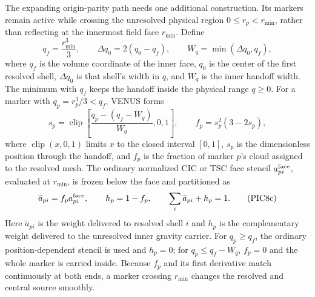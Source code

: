The expanding origin-parity path needs one additional construction.  Its
markers remain active while crossing the unresolved physical region
\(0\leq r_p<r_{\min}\), rather than reflecting at the innermost field face
\(r_{\min}\).  Define
\[
 q_f=\frac{r_{\min}^3}{3},\qquad
 \Delta q_0=2(q_0-q_f),\qquad
 W_q=\min(\Delta q_0,q_f),                               \tag{PIC8a}
\]
where \(q_f\) is the volume coordinate of the inner face, \(q_0\) is the
center of the first resolved shell, \(\Delta q_0\) is that shell's width in
\(q\), and \(W_q\) is the inner handoff width.  The minimum with \(q_f\)
keeps the handoff inside the physical range \(q\geq0\).  For a marker with
\(q_p=r_p^3/3<q_f\), VENUS forms
\[
 s_p=\operatorname{clip}\!\left[
       \frac{q_p-(q_f-W_q)}{W_q},0,1\right],
 \qquad f_p=s_p^2(3-2s_p),                               \tag{PIC8b}
\]
where \(\operatorname{clip}(x,0,1)\) limits \(x\) to the closed interval
\([0,1]\), \(s_p\) is the dimensionless position through the handoff, and
\(f_p\) is the fraction of marker \(p\)'s cloud assigned to the resolved
mesh.  The ordinary normalized CIC or TSC face stencil
\(a^{\rm face}_{pi}\), evaluated at \(r_{\min}\), is frozen below the face
and partitioned as
\[
 \widetilde a_{pi}=f_p a^{\rm face}_{pi},\qquad
 h_p=1-f_p,\qquad
 \sum_i\widetilde a_{pi}+h_p=1.                          \tag{PIC8c}
\]
Here \(\widetilde a_{pi}\) is the weight delivered to resolved shell \(i\)
and \(h_p\) is the complementary weight delivered to the unresolved inner
gravity carrier.  For \(q_p\geq q_f\), the ordinary position-dependent
stencil is used and \(h_p=0\); for \(q_p\leq q_f-W_q\), \(f_p=0\) and the
whole marker is carried inside.  Because \(f_p\) and its first derivative
match continuously at both ends, a marker crossing \(r_{\min}\) changes the
resolved and central source smoothly.

